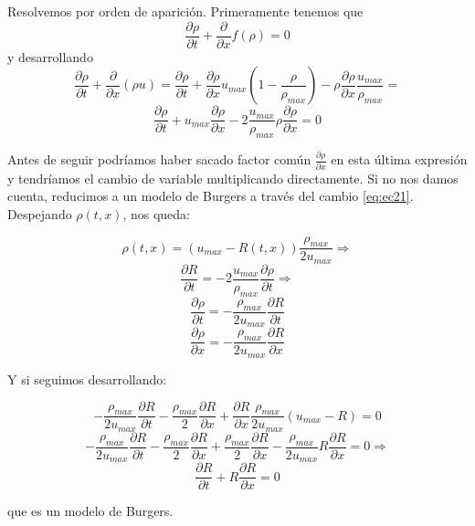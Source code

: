 \begin{ejercicio}
\begin{enumerate}
        Resolvemos por orden de aparición. Primeramente tenemos que 
        $$\dfrac{\partial \rho}{\partial t} + \dfrac{\partial}{\partial x} f(\rho) = 0$$
        y desarrollando
        $$\dfrac{\partial \rho}{\partial t} + \dfrac{\partial}{\partial x} (\rho u) = 
        \dfrac{\partial \rho}{\partial t} + \dfrac{\partial \rho}{\partial x} u_{max} \left( 1 - \dfrac{\rho}{\rho_{max}} \right) - 
        \rho \dfrac{\partial \rho}{\partial x} \dfrac{u_{max}}{\rho_{max}} =$$
        $$\boxed{\dfrac{\partial \rho}{\partial t} + u_{max} \dfrac{\partial \rho}{\partial x} - 2 \dfrac{u_{max}}{\rho_{max}} \rho \dfrac{\partial \rho}{\partial x} = 0}$$

        Antes de seguir podríamos haber sacado factor común $\frac{\partial \rho}{\partial x}$ en esta última expresión y tendríamos el cambio de variable multiplicando directamente.
        Si no nos damos cuenta, reducimos a un modelo de Burgers a través del cambio \eqref{eq:ec21}. Despejando $\rho(t,x)$, nos queda:

        $$\rho(t,x) = (u_{max} - R(t,x)) \dfrac{\rho_{max}}{2 u_{max}} \Longrightarrow$$
        $$\dfrac{\partial R}{\partial t} = - 2 \dfrac{u_{max}}{\rho_{max}} \dfrac{\partial \rho}{\partial t} \Longrightarrow$$
        $$\boxed{\dfrac{\partial \rho}{\partial t} = - \dfrac{\rho_{max}}{2 u_{max}} \dfrac{\partial R}{\partial t}}$$
        $$\boxed{\dfrac{\partial \rho}{\partial x} = - \dfrac{\rho_{max}}{2 u_{max}} \dfrac{\partial R}{\partial x}}$$

        Y si seguimos desarrollando:

        $$- \dfrac{\rho_{max}}{2 u_{max}} \dfrac{\partial R}{\partial t} - \dfrac{\rho_{max}}{2} \dfrac{\partial R}{\partial x} + 
        \dfrac{\partial R}{\partial x} \dfrac{\rho_{max}}{2 u_{max}} (u_{max} - R) = 0$$
        $$- \dfrac{\rho_{max}}{2 u_{max}} \dfrac{\partial R}{\partial t} - \dfrac{\rho_{max}}{2} \dfrac{\partial R}{\partial x} + 
        \dfrac{\rho_{max}}{2} \dfrac{\partial R}{\partial x} - \dfrac{\rho_{max}}{2 u_{max}} R \dfrac{\partial R}{\partial x} = 0 \Longrightarrow $$
        $$\boxed{\dfrac{\partial R}{\partial t} + R \dfrac{\partial R}{\partial x} = 0}$$

        que es un modelo de Burgers.


\end{enumerate}
\end{ejercicio}
